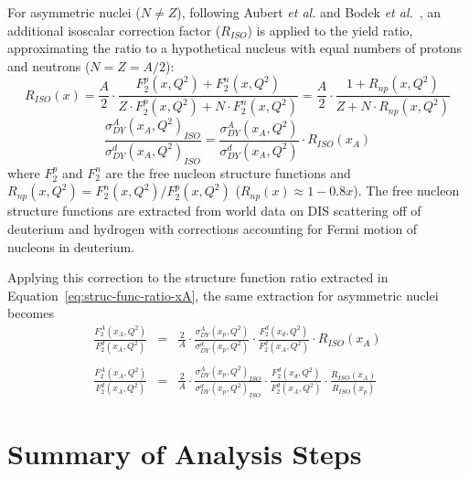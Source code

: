 
For asymmetric nuclei ($N\neq Z$), following Aubert \emph{et al.} and Bodek \emph{et al.}~\cite{Aubert:1983xm, PhysRevLett.50.1431}, an additional isoscalar correction factor ($R_{ISO}$) is applied to the yield ratio, approximating the ratio to a hypothetical nucleus with equal numbers of protons and neutrons ($N=Z=A/2$):
\begin{equation}
R_{ISO}(x) = \frac{A}{2} \cdot \frac{F_2^p(x, Q^2) + F_2^n(x, Q^2)}{Z\cdot F_2^p(x, Q^2) + N\cdot F_2^n(x,Q^2)} = \frac{A}{2} \cdot \frac{1+R_{np}(x, Q^2)}{Z + N\cdot R_{np}(x, Q^2)}
\end{equation}
\begin{equation}
\frac{\sigma^A_{DY}(x_A, Q^2)_{ISO}}{\sigma^d_{DY}(x_A, Q^2)_{ISO}} = \frac{\sigma^A_{DY}(x_A, Q^2)}{\sigma^d_{DY}(x_A, Q^2)} \cdot R_{ISO}(x_A)
\end{equation}
where $F_2^p$ and $F_2^n$ are the free nucleon structure functions and $R_{np}(x,Q^2) = F_2^n(x,Q^2)/F_2^p(x,Q^2)$ ($R_{np}(x)\approx 1 - 0.8 x$). The free nucleon structure functions are extracted from world data on DIS scattering\CN {} off of deuterium and hydrogen with corrections accounting for Fermi motion of nucleons in deuterium.

Applying this correction to the structure function ratio extracted in Equation~\ref{eq:struc-func-ratio-xA}, the same extraction for asymmetric nuclei becomes 
\begin{eqnarray}
\frac{F_2^A(x_A, Q^2)}{F_2^d(x_A, Q^2)} & = & \frac{2}{A} \cdot \frac{\sigma^A_{DY}(x_p, Q^2)}{\sigma^d_{DY}(x_p, Q^2)} \cdot \frac{F_2^d(x_d, Q^2)}{F_2^d(x_A, Q^2)} \cdot R_{ISO}(x_A) \\ 
& & \nonumber \\
\frac{F_2^A(x_A, Q^2)}{F_2^d(x_A, Q^2)} & = & \frac{2}{A} \cdot \frac{\sigma^A_{DY}(x_p, Q^2)_{ISO}}{\sigma^d_{DY}(x_p, Q^2)_{ISO}} \cdot \frac{F_2^d(x_d, Q^2)}{F_2^d(x_A, Q^2)} \cdot \frac{R_{ISO}(x_A) }{R_{ISO}(x_p)}
\end{eqnarray}

\section{Summary of Analysis Steps}

